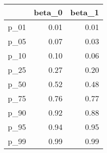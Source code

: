 \begin{table}[ht]
\centering
\begin{tabular}{rrr}
  \hline
 & beta\_0 & beta\_1 \\ 
  \hline
p\_01 & 0.01 & 0.01 \\ 
  p\_05 & 0.07 & 0.03 \\ 
  p\_10 & 0.10 & 0.06 \\ 
  p\_25 & 0.27 & 0.20 \\ 
  p\_50 & 0.52 & 0.48 \\ 
  p\_75 & 0.76 & 0.77 \\ 
  p\_90 & 0.92 & 0.88 \\ 
  p\_95 & 0.94 & 0.95 \\ 
  p\_99 & 0.99 & 0.99 \\ 
   \hline
\end{tabular}
\end{table}
